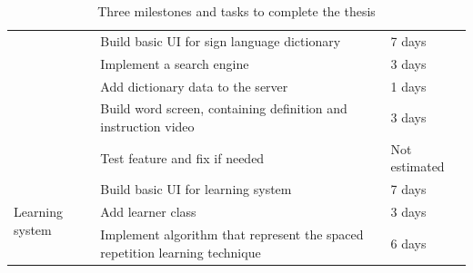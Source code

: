\begin{table}[H]
\begin{tabular}{ |p{4cm}|p{8cm}|l| }
		                                                            & Build basic UI for sign language dictionary                                 & 7 days         \\ \cline{2-3} 
		                                                            & Implement a search engine                                                   & 3 days         \\ \cline{2-3} 
		                                                            & Add dictionary data to the server                                           & 1 days         \\ \cline{2-3} 
		                                                            & Build word screen, containing definition and instruction video              & 3 days         \\ \cline{2-3} 
		                                                            & Test feature and fix if needed                                              & Not estimated  \\ \hline
		\multirow{3}{4cm}{Learning system}                          & Build basic UI for learning system                                          & 7 days         \\ \cline{2-3} 
		                                                            & Add learner class                                                           & 3 days         \\ \cline{2-3} 
		                                                            & Implement algorithm that represent the spaced repetition learning technique & 6 days         \\ \hline
	\end{tabular}
	\caption{Three milestones and tasks to complete the thesis}
  \label{tab:Chap5-upcomingPlan}
\end{table}
